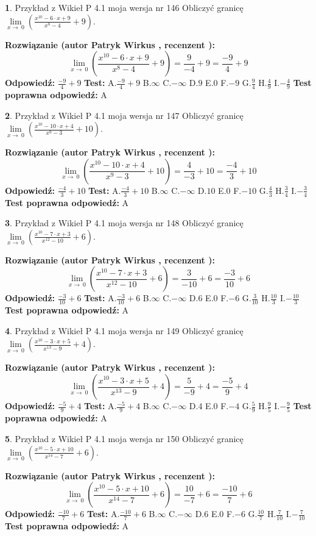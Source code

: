 \documentclass[12pt, a4paper]{article}
\theoremstyle{definition} %
\newtheorem{zad}{}
\newcommand{\zadStart}[1]{\begin{zad}#1\newline}
\newcommand{\zadStop}{\end{zad}}
\newcommand{\rozwStart}[2]{\noindent \textbf{Rozwiązanie (autor #1 , recenzent #2): }\newline}
\newcommand{\rozwStop}{\newline}
\newcommand{\odpStart}{\noindent \textbf{Odpowiedź:}\newline}
\newcommand{\odpStop}{\newline}
\newcommand{\testStart}{\noindent \textbf{Test:}\newline}
\newcommand{\testStop}{\newline}
\newcommand{\kluczStart}{\noindent \textbf{Test poprawna odpowiedź:}\newline}
\newcommand{\kluczStop}{\newline}
\begin{document}
\zadStart{Przykład z Wikieł P 4.1 moja wersja nr 146}
Obliczyć granicę $\lim\limits_{x\to\ 0}(\frac{x^{10}-6 \cdot x +9}{x^{8}-4}+9)$.
\zadStop
\rozwStart{Patryk Wirkus}{}
$$\lim\limits_{x\to\ 0}(\frac{x^{10}-6 \cdot x +9}{x^{8}-4}+9)=\frac{9}{-4}+9=\frac{-9}{4}+9$$
\rozwStop
\odpStart
$\frac{-9}{4}+9$
\odpStop
\testStart
A.$\frac{-9}{4}+9$
B.$\infty$
C.$-\infty$
D.$9$
E.$0$
F.$-9$
G.$\frac{9}{4}$
H.$\frac{4}{9}$
I.$-\frac{4}{9}$
\testStop
\kluczStart
A
\kluczStop



\zadStart{Przykład z Wikieł P 4.1 moja wersja nr 147}
Obliczyć granicę $\lim\limits_{x\to\ 0}(\frac{x^{10}-10 \cdot x +4}{x^{9}-3}+10)$.
\zadStop
\rozwStart{Patryk Wirkus}{}
$$\lim\limits_{x\to\ 0}(\frac{x^{10}-10 \cdot x +4}{x^{9}-3}+10)=\frac{4}{-3}+10=\frac{-4}{3}+10$$
\rozwStop
\odpStart
$\frac{-4}{3}+10$
\odpStop
\testStart
A.$\frac{-4}{3}+10$
B.$\infty$
C.$-\infty$
D.$10$
E.$0$
F.$-10$
G.$\frac{4}{3}$
H.$\frac{3}{4}$
I.$-\frac{3}{4}$
\testStop
\kluczStart
A
\kluczStop



\zadStart{Przykład z Wikieł P 4.1 moja wersja nr 148}
Obliczyć granicę $\lim\limits_{x\to\ 0}(\frac{x^{10}-7 \cdot x +3}{x^{12}-10}+6)$.
\zadStop
\rozwStart{Patryk Wirkus}{}
$$\lim\limits_{x\to\ 0}(\frac{x^{10}-7 \cdot x +3}{x^{12}-10}+6)=\frac{3}{-10}+6=\frac{-3}{10}+6$$
\rozwStop
\odpStart
$\frac{-3}{10}+6$
\odpStop
\testStart
A.$\frac{-3}{10}+6$
B.$\infty$
C.$-\infty$
D.$6$
E.$0$
F.$-6$
G.$\frac{3}{10}$
H.$\frac{10}{3}$
I.$-\frac{10}{3}$
\testStop
\kluczStart
A
\kluczStop



\zadStart{Przykład z Wikieł P 4.1 moja wersja nr 149}
Obliczyć granicę $\lim\limits_{x\to\ 0}(\frac{x^{10}-3 \cdot x +5}{x^{13}-9}+4)$.
\zadStop
\rozwStart{Patryk Wirkus}{}
$$\lim\limits_{x\to\ 0}(\frac{x^{10}-3 \cdot x +5}{x^{13}-9}+4)=\frac{5}{-9}+4=\frac{-5}{9}+4$$
\rozwStop
\odpStart
$\frac{-5}{9}+4$
\odpStop
\testStart
A.$\frac{-5}{9}+4$
B.$\infty$
C.$-\infty$
D.$4$
E.$0$
F.$-4$
G.$\frac{5}{9}$
H.$\frac{9}{5}$
I.$-\frac{9}{5}$
\testStop
\kluczStart
A
\kluczStop



\zadStart{Przykład z Wikieł P 4.1 moja wersja nr 150}
Obliczyć granicę $\lim\limits_{x\to\ 0}(\frac{x^{10}-5 \cdot x +10}{x^{14}-7}+6)$.
\zadStop
\rozwStart{Patryk Wirkus}{}
$$\lim\limits_{x\to\ 0}(\frac{x^{10}-5 \cdot x +10}{x^{14}-7}+6)=\frac{10}{-7}+6=\frac{-10}{7}+6$$
\rozwStop
\odpStart
$\frac{-10}{7}+6$
\odpStop
\testStart
A.$\frac{-10}{7}+6$
B.$\infty$
C.$-\infty$
D.$6$
E.$0$
F.$-6$
G.$\frac{10}{7}$
H.$\frac{7}{10}$
I.$-\frac{7}{10}$
\testStop
\kluczStart
A
\kluczStop
\end{document}
